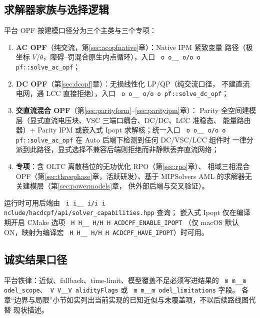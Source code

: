 \documentclass[UTF8,fontset=windows,a4paper,11pt]{ctexart}
\makeatletter
\newcommand{\fld}[1]{\texttt{\fld@scan#1\fld@stop}}
\def\fld@scan#1{%
  \ifx#1\fld@stop
  \else
    \ifx#1\_\_\allowbreak\else#1\fi
    \expandafter\fld@scan
  \fi}
\newcommand{\srcpath}[1]{\texttt{\src@scan#1\src@stop}}
\def\src@scan#1{%
  \ifx#1\src@stop
  \else
    \ifx#1\_\_\allowbreak\else
    \ifx#1/#1\allowbreak\else
    #1\fi\fi
    \expandafter\src@scan
  \fi}
\makeatother
\begin{document}
\subsection{求解器家族与选择逻辑}
平台 OPF 按建模口径分为三个主类与三个专项：
\begin{enumerate}
  \item \textbf{AC OPF}（纯交流，第\ref{sec:acopfnative}章）：Native IPM 紧致变量
        路径（极坐标 $V/\theta$，障碍--罚混合原生内点循环），入口
        \srcpath{opf::solve\_ac\_opf}；
  \item \textbf{DC OPF}（第\ref{sec:dcopf}章）：无损线性化 LP/QP（纯交流口径，
        不建直流电网，遇 LCC 直接拒绝），入口 \srcpath{opf::solve\_dc\_opf}；
  \item \textbf{交直流混合 OPF}（第\ref{sec:parityform}--\ref{sec:parityipm}章）：
        Parity 全空间建模层（显式直流电压块、VSC 三端口耦合、DC/DC、LCC 准稳态、
        能量路由器）+ Parity IPM 或嵌入式 Ipopt 求解核；统一入口
        \srcpath{opf::solve\_ac\_opf} 在 Auto 后端下检测到任何 DC/VSC/LCC 组件时
        一律分派到此路径，显式选择不兼容后端则拒绝而非静默丢弃直流网络；
  \item \textbf{专项}：含 OLTC 离散档位的无功优化 RPO（第\ref{sec:rpo}章）、
        相域三相混合 OPF（第\ref{sec:threephase}章，活跃研发）、基于
        MIPSolvers AML 的求解器无关建模层（第\ref{sec:powermodels}章，
        供外部后端与交叉验证）。
\end{enumerate}
运行时可用后端由 \srcpath{include/hacdcpf/api/solver\_capabilities.hpp} 查询；
嵌入式 Ipopt 仅在编译期开启 CMake 选项 \srcpath{HACDCPF\_ENABLE\_IPOPT}
（仅 macOS 默认 ON，映射为编译宏 \srcpath{HACDCPF\_HAVE\_IPOPT}）时可用。

\subsection{诚实结果口径}
平台铁律：近似、fallback、time-limit、模型覆盖不足必须写进结果的
\fld{model\_scope}、\fld{ValidityFlags} 或 \fld{model\_\allowbreak limitations} 字段。
各章“边界与局限”小节如实列出当前实现的已知近似与未覆盖项，不以后续路线图代替
现状描述。
\end{document}
